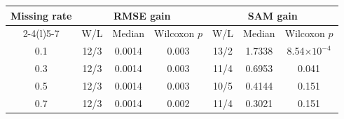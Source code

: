 \begin{tabular}{@{}c ccc ccc@{}}
\toprule
\multirow{2}{*}{Missing rate} &
\multicolumn{3}{c}{RMSE gain} &
\multicolumn{3}{c}{SAM gain} \\
\cmidrule(lr){2-4}\cmidrule(l){5-7}
& W/L & Median & Wilcoxon $p$ & W/L & Median & Wilcoxon $p$ \\
\midrule
0.1 & 12/3 & 0.0014 & 0.003 & 13/2 & 1.7338 & 8.54$\times10^{-4}$ \\
0.3 & 12/3 & 0.0014 & 0.003 & 11/4 & 0.6953 & 0.041 \\
0.5 & 12/3 & 0.0014 & 0.003 & 10/5 & 0.4144 & 0.151 \\
0.7 & 12/3 & 0.0014 & 0.002 & 11/4 & 0.3021 & 0.151 \\
\bottomrule
\end{tabular}
